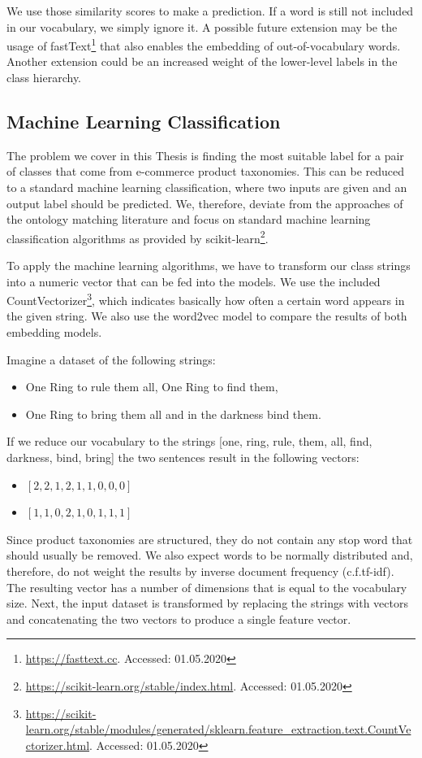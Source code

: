 We use those similarity scores to make a prediction.
If a word is still not included in our vocabulary, we simply ignore it.
A possible future extension may be the usage of fastText\footnote{\url{https://fasttext.cc}. Accessed: 01.05.2020}
that also enables the embedding of out-of-vocabulary words.
Another extension could be an increased weight of the lower-level labels in the class hierarchy.

\subsection{Machine Learning Classification}
\label{subsec:machine-learning}

The problem we cover in this Thesis is finding the most suitable label for a pair of classes that
come from e-commerce product taxonomies.
This can be reduced to a standard machine learning classification, where two inputs are given
and an output label should be predicted.
We, therefore, deviate from the approaches of the ontology matching literature and focus on
standard machine learning classification algorithms as provided by scikit-learn\footnote{\url{https://scikit-learn.org/stable/index.html}. Accessed: 01.05.2020}.

To apply the machine learning algorithms, we have to transform our class strings into a numeric vector that
can be fed into the models.
We use the included CountVectorizer\footnote{\url{https://scikit-learn.org/stable/modules/generated/sklearn.feature\_extraction.text.CountVectorizer.html}. Accessed: 01.05.2020},
which indicates basically how often a certain word appears in the given string.
We also use the word2vec model to compare the results of both embedding models.

Imagine a dataset of the following strings:
\begin{itemize}
    \item One Ring to rule them all, One Ring to find them,
    \item One Ring to bring them all and in the darkness bind them.
\end{itemize}
If we reduce our vocabulary to the strings [one, ring, rule, them, all, find, darkness, bind, bring]
the two sentences result in the following vectors:
\begin{itemize}
    \item $[2, 2, 1, 2, 1, 1, 0, 0, 0]$
    \item $[1, 1, 0, 2, 1, 0, 1, 1, 1]$
\end{itemize}
Since product taxonomies are structured, they do not contain any stop word that should usually be removed.
We also expect words to be normally distributed and, therefore, do not weight the results by inverse document
frequency (c.f.\@ tf-idf).
The resulting vector has a number of dimensions  that is equal to the vocabulary size.
Next, the input dataset is transformed by replacing the strings with vectors and concatenating the
two vectors to produce a single feature vector.

